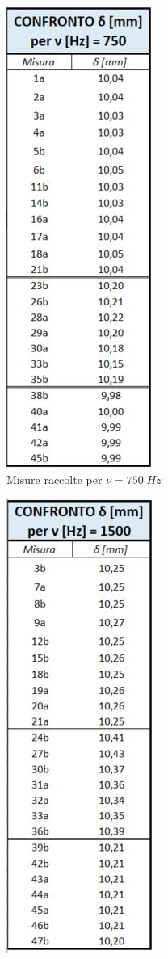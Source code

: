 \documentclass{article}
\begin{document}
\begin{figure}[h]
    \centering
    \begin{subfigure}[h]{0.2\textwidth}
        \centering
        \includegraphics{Coerenza_T1.JPG}
        \caption{Misure raccolte per $\nu=750 \; Hz$}
        \label{Tab_750}        
    \end{subfigure}
    \hfill
    \begin{subfigure}[h]{0.2\textwidth}
        \centering
        \includegraphics{Coerenza_T2.JPG}

\end{subfigure}
\end{figure}
\end{document}
